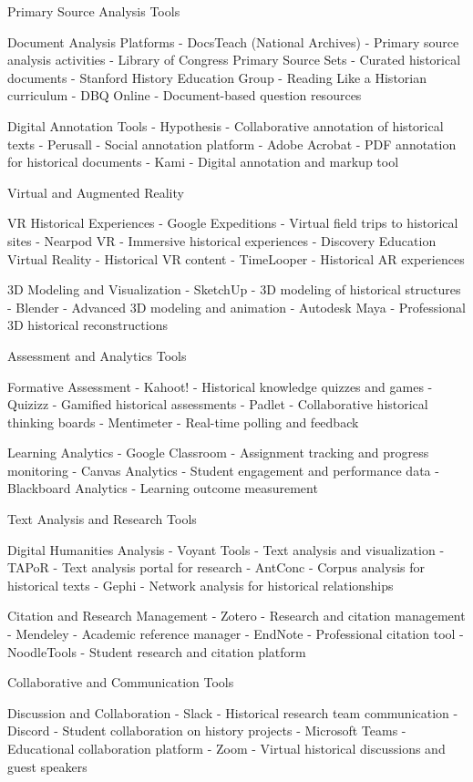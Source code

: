 \begin{appendices}
  Primary Source Analysis Tools

  Document Analysis Platforms
-  DocsTeach  (National Archives) - Primary source analysis activities
-  Library of Congress Primary Source Sets  - Curated historical documents
-  Stanford History Education Group  - Reading Like a Historian curriculum
-  DBQ Online  - Document-based question resources

  Digital Annotation Tools
-  Hypothesis  - Collaborative annotation of historical texts
-  Perusall  - Social annotation platform
-  Adobe Acrobat  - PDF annotation for historical documents
-  Kami  - Digital annotation and markup tool

  Virtual and Augmented Reality

  VR Historical Experiences
-  Google Expeditions  - Virtual field trips to historical sites
-  Nearpod VR  - Immersive historical experiences
-  Discovery Education Virtual Reality  - Historical VR content
-  TimeLooper  - Historical AR experiences

  3D Modeling and Visualization
-  SketchUp  - 3D modeling of historical structures
-  Blender  - Advanced 3D modeling and animation
-  Autodesk Maya  - Professional 3D historical reconstructions

  Assessment and Analytics Tools

  Formative Assessment
-  Kahoot!  - Historical knowledge quizzes and games
-  Quizizz  - Gamified historical assessments
-  Padlet  - Collaborative historical thinking boards
-  Mentimeter  - Real-time polling and feedback

  Learning Analytics
-  Google Classroom  - Assignment tracking and progress monitoring
-  Canvas Analytics  - Student engagement and performance data
-  Blackboard Analytics  - Learning outcome measurement

  Text Analysis and Research Tools

  Digital Humanities Analysis 
-  Voyant Tools  - Text analysis and visualization
-  TAPoR  - Text analysis portal for research
-  AntConc  - Corpus analysis for historical texts
-  Gephi  - Network analysis for historical relationships

  Citation and Research Management
-  Zotero  - Research and citation management
-  Mendeley  - Academic reference manager
-  EndNote  - Professional citation tool
-  NoodleTools  - Student research and citation platform

 Collaborative and Communication Tools

  Discussion and Collaboration
-  Slack  - Historical research team communication
-  Discord  - Student collaboration on history projects
-  Microsoft Teams  - Educational collaboration platform
-  Zoom  - Virtual historical discussions and guest speakers


\end{appendices}
